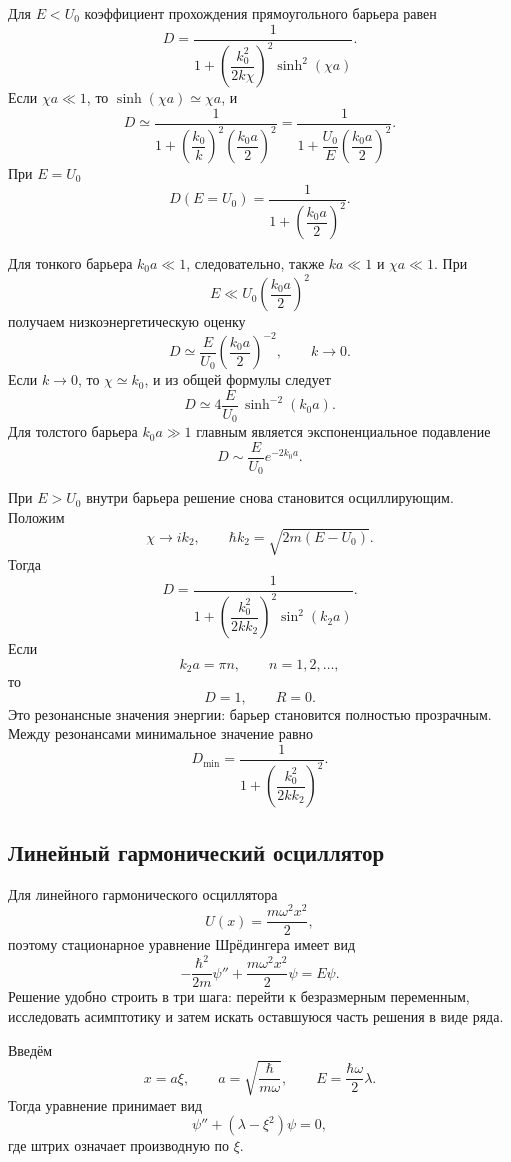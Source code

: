 \documentclass[12pt,a4paper]{article}
\begin{document}
Для $E<U_0$ коэффициент прохождения прямоугольного барьера равен
\[
    \boxed{
    D=\frac{1}{1+\left(\dfrac{k_0^2}{2k\chi}\right)^2
    \sinh^2(\chi a)}}.
\]
Если $\chi a\ll1$, то $\sinh(\chi a)\simeq\chi a$, и
\[
    D\simeq
    \frac{1}{1+\left(\dfrac{k_0}{k}\right)^2
    \left(\dfrac{k_0a}{2}\right)^2}
    =\frac{1}{1+\dfrac{U_0}{E}
    \left(\dfrac{k_0a}{2}\right)^2}.
\]
При $E=U_0$
\[
    \boxed{D(E=U_0)=\frac{1}{1+\left(\dfrac{k_0a}{2}\right)^2}}.
\]

Для тонкого барьера $k_0a\ll1$, следовательно, также $ka\ll1$ и
$\chi a\ll1$. При
\[
    E\ll U_0\left(\frac{k_0a}{2}\right)^2
\]
получаем низкоэнергетическую оценку
\[
    D\simeq\frac{E}{U_0}
    \left(\frac{k_0a}{2}\right)^{-2},
    \qquad k\to0.
\]
Если $k\to0$, то $\chi\simeq k_0$, и из общей формулы следует
\[
    D\simeq4\frac{E}{U_0}\,\sinh^{-2}(k_0a).
\]
Для толстого барьера $k_0a\gg1$ главным является экспоненциальное
подавление
\[
    D\sim\frac{E}{U_0}e^{-2k_0a}.
\]

При $E>U_0$ внутри барьера решение снова становится осциллирующим.
Положим
\[
    \chi\to ik_2,
    \qquad
    \hbar k_2=\sqrt{2m(E-U_0)}.
\]
Тогда
\[
    \boxed{
    D=\frac{1}{1+\left(\dfrac{k_0^2}{2kk_2}\right)^2
    \sin^2(k_2a)}}.
\]
Если
\[
    k_2a=\pi n,
    \qquad n=1,2,\ldots,
\]
то
\[
    \boxed{D=1,\qquad R=0}.
\]
Это резонансные значения энергии: барьер становится полностью прозрачным.
Между резонансами минимальное значение равно
\[
    \boxed{D_{\min}=\frac{1}{1+
    \left(\dfrac{k_0^2}{2kk_2}\right)^2}}.
\]

\subsection{Линейный гармонический осциллятор}

Для линейного гармонического осциллятора
\[
    U(x)=\frac{m\omega^2x^2}{2},
\]
поэтому стационарное уравнение Шрёдингера имеет вид
\[
    -\frac{\hbar^2}{2m}\psi''
    +\frac{m\omega^2x^2}{2}\psi=E\psi.
\]
Решение удобно строить в три шага: перейти к безразмерным переменным,
исследовать асимптотику и затем искать оставшуюся часть решения в виде ряда.

Введём
\[
    x=a\xi,
    \qquad
    a=\sqrt{\frac{\hbar}{m\omega}},
    \qquad
    E=\frac{\hbar\omega}{2}\lambda.
\]
Тогда уравнение принимает вид
\[
    \boxed{\psi''+(\lambda-\xi^2)\psi=0},
\]
где штрих означает производную по $\xi$.
\end{document}
